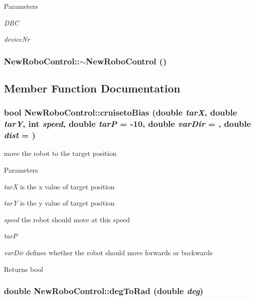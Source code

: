 \begin{DoxyParams}{Parameters}
\item[{\em DBC}]\item[{\em deviceNr}]\end{DoxyParams}
\hypertarget{classNewRoboControl_ae63cbd6c60d37882d176e9e7d60b11ba}{
\subsubsection[{$\sim$NewRoboControl}]{\setlength{\rightskip}{0pt plus 5cm}NewRoboControl::$\sim$NewRoboControl ()}}
\label{classNewRoboControl_ae63cbd6c60d37882d176e9e7d60b11ba}


\subsection{Member Function Documentation}
\hypertarget{classNewRoboControl_a30944b8982d85ab2ee83fd248b731bc0}{
\subsubsection[{cruisetoBias}]{\setlength{\rightskip}{0pt plus 5cm}bool NewRoboControl::cruisetoBias (double {\em tarX}, \/  double {\em tarY}, \/  int {\em speed}, \/  double {\em tarP} = {\ttfamily -\/10}, \/  double {\em varDir} = {}, \/  double {\em dist} = {})}}
\label{classNewRoboControl_a30944b8982d85ab2ee83fd248b731bc0}


move the robot to the target position 


\begin{DoxyParams}{Parameters}
\item[{\em tarX}]is the x value of target position \item[{\em tarY}]is the y value of target position \item[{\em speed}]the robot should move at this speed \item[{\em tarP}]\item[{\em varDir}]defines whether the robot should move forwards or backwards \end{DoxyParams}
\begin{DoxyReturn}{Returns}
bool 
\end{DoxyReturn}
\hypertarget{classNewRoboControl_a44def2cefef0f6c41b180bda044dfdfb}{
\subsubsection[{degToRad}]{\setlength{\rightskip}{0pt plus 5cm}double NewRoboControl::degToRad (double {\em deg})}}
\label{classNewRoboControl_a44def2cefef0f6c41b180bda044dfdfb}


